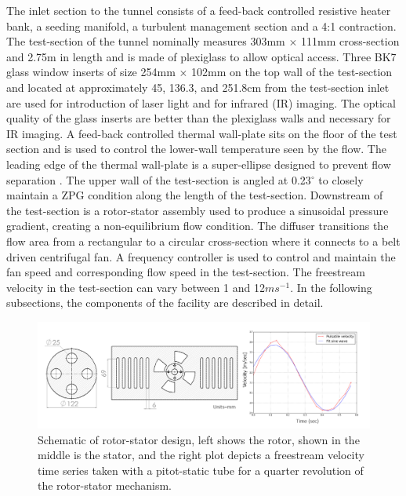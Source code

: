 The inlet section to the tunnel consists of a feed-back controlled resistive heater bank, a seeding manifold, a turbulent management section and a 4:1 contraction. The test-section of the tunnel nominally measures 303mm $\times$ 111mm cross-section and 2.75m in length and is made of plexiglass to allow optical access. Three BK7 glass window inserts of size 254mm $\times$ 102mm on the top wall of the test-section and located at approximately 45, 136.3, and 251.8cm from the test-section inlet are used for introduction of laser light and for infrared (IR) imaging. The optical quality of the glass inserts are better than the plexiglass walls and necessary for IR imaging. A feed-back controlled thermal wall-plate sits on the floor of the test section and is used to control the lower-wall temperature seen by the flow. The leading edge of the thermal wall-plate is a super-ellipse designed to prevent flow separation \cite{R.Narasimha1994}. The upper wall of the test-section is angled at 0.23$^\circ$ to closely maintain a ZPG condition along the length of the test-section. Downstream of the test-section is a rotor-stator assembly used to produce a sinusoidal pressure gradient, creating a non-equilibrium flow condition. The diffuser transitions the flow area from a rectangular to a circular cross-section where it connects to a belt driven centrifugal fan.  A frequency controller is used to control and maintain the fan speed and corresponding flow speed in the test-section. The freestream velocity in the test-section can vary between 1 and 12$ms^{-1}$. In the following subsections,  the components of the facility are described in detail.

\begin{figure}[t!]
\centering
\includegraphics[scale=0.5]{figures/facility/rotor_stator.png}
\caption{ \footnotesize Schematic of rotor-stator design, left shows the rotor, shown in the middle is the stator, and the right plot depicts a freestream velocity time series taken with a pitot-static tube for a quarter revolution of the rotor-stator mechanism.}
\label{fig:rotor_stator}
\end{figure}

